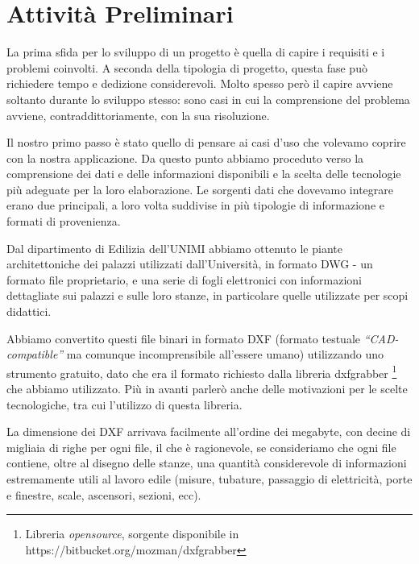 \documentclass[12pt]{report}
\begin{document}
% 
% 
\chapter{Attività Preliminari}
\label{cap2}

La prima sfida per lo sviluppo di un progetto è quella di capire i
requisiti e i problemi coinvolti. A seconda della tipologia di
progetto, questa fase può richiedere tempo e dedizione considerevoli. Molto
spesso però il capire avviene soltanto durante lo sviluppo stesso:
sono casi in cui la comprensione del problema avviene, contraddittoriamente,
con la sua risoluzione.

Il nostro primo passo è stato quello di pensare ai casi d'uso che
volevamo coprire con la nostra applicazione. Da questo punto abbiamo
proceduto verso la comprensione dei dati e delle informazioni
disponibili e la scelta delle tecnologie più adeguate per la loro
elaborazione. Le sorgenti dati che dovevamo integrare erano due
principali, a loro volta suddivise in più tipologie di informazione e
formati di provenienza.

Dal dipartimento di Edilizia dell'UNIMI abbiamo ottenuto le piante
architettoniche dei palazzi utilizzati dall'Università, in formato DWG
- un formato file proprietario, e una serie di fogli elettronici con
informazioni dettagliate sui palazzi e sulle loro stanze, in particolare
quelle utilizzate per scopi didattici.

Abbiamo convertito questi file binari in formato DXF (formato testuale
\textit{``CAD-compatible''} ma comunque incomprensibile all'essere
umano) utilizzando uno strumento gratuito, dato che era il formato
richiesto dalla libreria dxfgrabber \footnote{Libreria \textit{opensource},
sorgente disponibile in https://bitbucket.org/mozman/dxfgrabber} che abbiamo
utilizzato. Più in avanti parlerò anche delle motivazioni per le scelte
tecnologiche, tra cui l'utilizzo di questa libreria.

La dimensione dei DXF arrivava facilmente all'ordine dei
megabyte, con decine di migliaia di righe per ogni file, il che è ragionevole, se
consideriamo che ogni file contiene, oltre al disegno delle stanze, una 
quantità considerevole di informazioni estremamente utili al lavoro edile
(misure, tubature, passaggio di elettricità, porte e finestre, scale, 
ascensori, sezioni, ecc).
\end{document}
